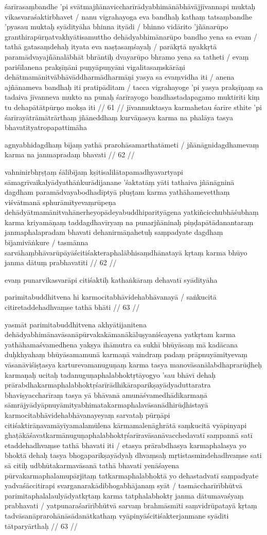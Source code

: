 śarīrasaṃbandhe 'pi svātmajñānaviccharīrādyabhimānābhāvājjīvannapi muktaḥ vikasvaraśaktirbhavet  / nanu vigrahayoga eva bandhaḥ kathaṃ tatsaṃbandhe 'pyasau muktaḥ syādityāha bhinna ityādi  / bhinno vidārito 'jñānarūpo granthirapūrṇatvakhyātisamuttho dehādyabhimānarūpo bandho yena sa evam  / tathā gatasaṃdehaḥ ityata eva naṣṭasaṃśayaḥ  / parākṛtā nyakkṛtā paramādvayajñānalābhāt bhrāntiḥ dvayarūpo bhramo yena sa tatheti  / evaṃ pariśīlanena prakṣīṇāni puṇyāpuṇyāni vigalitasaṃskārāṇi dehātmamānitvābhāvāddharmādharmāṇi yasya sa evaṃvidha iti  / anena ajñānameva bandhaḥ iti pratipāditam  / tacca vigrahayoge 'pi yasya prakṣīṇaṃ sa tadaiva jīvanneva mukto na punaḥ śarīrayogo bandhastadapagamo muktiriti kiṃ tu dehapātātpūrṇo mokṣa iti  // 61  //
jīvanmuktasya karmahetau śarīre sthite 'pi śarīrayātrāmātrārthaṃ jñāneddhaṃ kurvāṇasya karma na phalāya tasya bhavatītyatropapattimāha

agnyabhidagdhaṃ bījaṃ yathā prarohāsamarthatāmeti  /
jñānāgnidagdhamevaṃ karma na janmapradaṃ bhavati  // 62  //

vahninirbhṛṣṭaṃ śālibījaṃ kṣitisalilātapamadhyavartyapi sāmagrīvaikalyādyathāṅkurādijanane 'śaktatāṃ yāti tathaiva jñānāgninā dagdham paramādvayabodhadīptyā pluṣṭam karma yathāhamevetthaṃ viśvātmanā sphurāmītyevaṃrūpeṇa dehādyātmamānitvahānerheyopādeyabuddhiparityāgena yatkiñcicchubhāśubhaṃ karma kriyamāṇaṃ taddagdhavīryaṃ na punarjñāninaḥ piṇḍapātādanantaraṃ janmaphalapradam bhavati dehanirmāṇahetuḥ saṃpadyate dagdhaṃ bījamivāṅkure  / tasmānna sarvāhaṃbhāvarūpāyāścitiśakteraphalābhisaṃdhānatayā kṛtaṃ karma bhūyo janma dātuṃ prabhavatīti  // 62  //

evaṃ punarvikasvarāpi citiśaktiḥ kathaṅkāraṃ dehavatī syādityāha

parimitabuddhitvena hi karmocitabhāvidehabhāvanayā  /
saṅkucitā citiretaddehadhvaṃse tathā bhāti  // 63  //

yasmāt parimitabuddhitvena akhyātijanitena dehādyabhimānavāsanāpūrvakakāmanākāluṣyaniścayena yatkṛtam karma yathāhamaśvamedhena yakṣya ihāmutra ca sukhī bhūyāsaṃ mā kadācana duḥkhyahaṃ bhūyāsamamunā karmaṇā vaindraṃ padaṃ prāpnuyāmityevaṃ vāsanāviśiṣṭasya karturevamanuguṇaṃ karma tasya manovāsanālabdhaprarūḍheḥ karmaṇaḥ ucitaḥ tadanuguṇaphalabhoktṛtāyogyo 'sau bhāvī dehaḥ prārabdhakarmaphalabhoktṛśarīrādhikāraparikṣayādyaduttaratra bhaviṣyaccharīraṃ tasya yā bhāvanā amunāśvamedhādikarmaṇā sāmrājyādyāpnuyāmityabhimatakarmaphalavāsanādhirūḍhistayā karmocitabhāvidehabhāvanayeyaṃ sarvataḥ pūrṇāpi citiśaktirāṇavamāyīyamalamūlena kārmamalenāghrātā saṃkucitā vyāpinyapi ghaṭākāśavatkarmānuguṇaphalabhoktṛśarīravāsanāvacchedavatī saṃpannā satī etaddehadhvaṃse tathā bhavati iti  / etasya prārabdhasya karmaphalasya yo bhoktā dehaḥ tasya bhogaparikṣayādyaḥ dhvaṃsaḥ mṛtistasmindehadhvaṃse sati sā citiḥ udbhūtakarmavāsanā tathā bhavati yenāśayena pūrvakarmaphalamupārjitaṃ tatkarmaphalabhoktā yo dehastadvatī saṃpadyate yadvaśāccitirapi svarganarakādibhogabhājanaṃ syāt  / tasmāccharīrībhūtvā parimitaphalalaulyādyatkṛtaṃ karma tatphalabhoktṛ janma dātumavaśyaṃ prabhavati  / yatpunaraśarīrībhūtvā sarvaṃ brahmāsmīti saṃvidrūpatayā kṛtaṃ tadvāsanāprarohānāsādanātkathaṃ vyāpinyāścitiśakterjanmane syāditi tātparyārthaḥ  // 63  //


